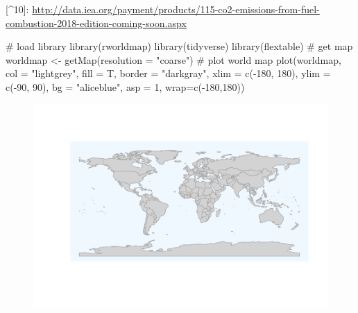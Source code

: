 \documentclass[
  letterpaper,
  DIV=11,
  numbers=noendperiod]{scrartcl}
\newenvironment{Shaded}{\begin{snugshade}}{\end{snugshade}}
\newcommand{\AttributeTok}[1]{\textcolor[rgb]{0.40,0.46,0.14}{#1}}
\newcommand{\CommentTok}[1]{\textcolor[rgb]{0.37,0.37,0.37}{#1}}
\newcommand{\DecValTok}[1]{\textcolor[rgb]{0.68,0.00,0.00}{#1}}
\newcommand{\FunctionTok}[1]{\textcolor[rgb]{0.28,0.35,0.67}{#1}}
\newcommand{\NormalTok}[1]{\textcolor[rgb]{0.00,0.46,0.62}{#1}}
\newcommand{\OtherTok}[1]{\textcolor[rgb]{0.00,0.46,0.62}{#1}}
\newcommand{\SpecialCharTok}[1]{\textcolor[rgb]{0.37,0.37,0.37}{#1}}
\newcommand{\StringTok}[1]{\textcolor[rgb]{0.13,0.47,0.30}{#1}}
\begin{document}
{[}\^{}10{]}:
\url{http://data.iea.org/payment/products/115-co2-emissions-from-fuel-combustion-2018-edition-coming-soon.aspx}

\begin{Shaded}
\begin{Highlighting}[]
\CommentTok{\# load library}
\FunctionTok{library}\NormalTok{(rworldmap)}
\FunctionTok{library}\NormalTok{(tidyverse)}
\FunctionTok{library}\NormalTok{(flextable)}
\CommentTok{\# get map}
\NormalTok{worldmap }\OtherTok{\textless{}{-}} \FunctionTok{getMap}\NormalTok{(}\AttributeTok{resolution =} \StringTok{"coarse"}\NormalTok{)}
\CommentTok{\# plot world map}
\FunctionTok{plot}\NormalTok{(worldmap, }\AttributeTok{col =} \StringTok{"lightgrey"}\NormalTok{, }
     \AttributeTok{fill =}\NormalTok{ T, }\AttributeTok{border =} \StringTok{"darkgray"}\NormalTok{,}
     \AttributeTok{xlim =} \FunctionTok{c}\NormalTok{(}\SpecialCharTok{{-}}\DecValTok{180}\NormalTok{, }\DecValTok{180}\NormalTok{), }\AttributeTok{ylim =} \FunctionTok{c}\NormalTok{(}\SpecialCharTok{{-}}\DecValTok{90}\NormalTok{, }\DecValTok{90}\NormalTok{),}
     \AttributeTok{bg =} \StringTok{"aliceblue"}\NormalTok{,}
     \AttributeTok{asp =} \DecValTok{1}\NormalTok{, }\AttributeTok{wrap=}\FunctionTok{c}\NormalTok{(}\SpecialCharTok{{-}}\DecValTok{180}\NormalTok{,}\DecValTok{180}\NormalTok{))}
\end{Highlighting}
\end{Shaded}

\begin{figure}[H]

{\centering \includegraphics{EE_R-R_files/figure-pdf/unnamed-chunk-2-1.pdf}

}

\end{figure}
\end{document}

